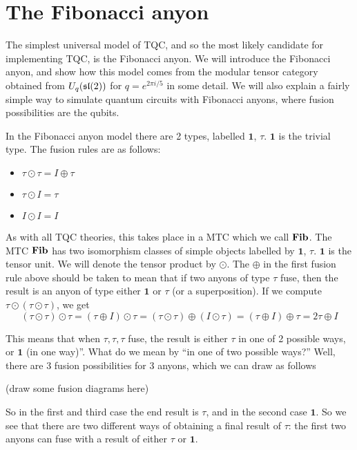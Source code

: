 
\section{The Fibonacci anyon}
The simplest universal model of TQC, and so the most likely candidate for
implementing TQC, is the Fibonacci anyon. We will introduce the Fibonacci
anyon, and show how this model comes from the modular tensor category obtained
from $U_q(\mathfrak{sl}(2))$ for $q=e^{2\pi i/5}$ in some detail. We will also explain a
fairly simple way to simulate quantum circuits with Fibonacci anyons, where
fusion possibilities  are the qubits.

In the Fibonacci anyon model there are 2 types, labelled $\mathbf{1}$, $\tau$. $\mathbf{1}$ is the trivial type. The fusion rules are as follows: 


\begin{itemize}
    \item $\tau \odot \tau = I \oplus \tau$
    \item $\tau \odot I = \tau$
    \item $I \odot I = I$
\end{itemize}

As with all TQC theories, this takes place in a MTC which we call $\mathbf{Fib}$. The
MTC $\mathbf{Fib}$ has two isomorphism classes of simple objects labelled by
$\mathbf{1}$, $\tau$. $\mathbf{1}$ is the tensor unit. We will denote the
tensor product by $\odot$. The $\oplus$ in the first fusion rule above should
be taken to mean that if two anyons of type $\tau$ fuse, then the result is an
anyon of type either $\mathbf{1}$ or $\tau$ (or a superposition). If we compute
$\tau \odot (\tau \odot \tau)$, we get
\begin{equation}
    (\tau \odot \tau) \odot \tau = (\tau \oplus I) \odot \tau = (\tau \odot \tau) \oplus (I \odot \tau) = (\tau \oplus I) \oplus \tau = 2\tau \oplus I
\end{equation}

This means that when $\tau,\tau,\tau$ fuse, the result is either $\tau$ in one of
2 possible ways, or $\mathbf{1}$ (in one way)''. What do we mean by ``in one of two
possible ways?'' Well, there are 3 fusion possibilities for 3 anyons, which we
can draw as follows 
\begin{center}
    (draw some fusion diagrams here)
\end{center}

So in the first and third case the end result is $\tau$, and in the second case
$\mathbf{1}$. So we see that there are two different ways of obtaining a final
result of $\tau$: the first two anyons can fuse with a result of either $\tau$
or $\mathbf{1}$.


